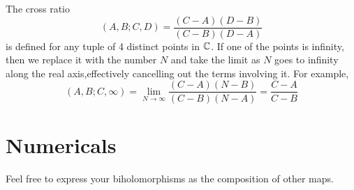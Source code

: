 \documentclass{homework}
\begin{document}
                                                                    \begin{solution}
                                                                    The cross ratio 
                                                                    \[
                                                                    (A,B;C,D) = \frac{(C-A)(D-B)}{(C-B)(D-A)}
                                                                    \]
                                                                    is defined for any tuple of 4 distinct points in $\mathbb{C}$. If one of the points is infinity, then we replace it with the number $N$ and take the limit as $N$ goes to infinity along the real axis,effectively cancelling out the terms involving it. For example,
                                                                    \[
                                                                    (A,B;C,\infty) = \lim_{N\to\infty} \frac{(C-A)(N-B)}{(C-B)(N-A)} = \frac{C-A}{C-B} 
                                                                    \]
                                                                    \end{solution}

                                                                    \section{Numericals}

                                                                    Feel free to express your
                                                                    biholomorphisms as the composition of other maps.
\end{document}
